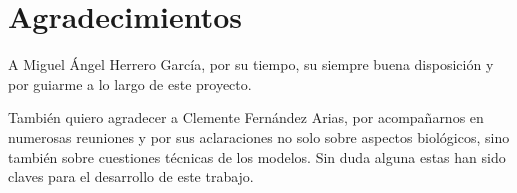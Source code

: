 
\chapter*{Agradecimientos}

A Miguel Ángel Herrero García, por su tiempo, su siempre buena disposición y por guiarme a lo largo de este proyecto.

También quiero agradecer a Clemente Fernández Arias, por acompañarnos en numerosas reuniones y por sus aclaraciones no solo sobre aspectos biológicos, sino también sobre cuestiones técnicas de los modelos. Sin duda alguna estas han sido claves para el desarrollo de este trabajo. 








